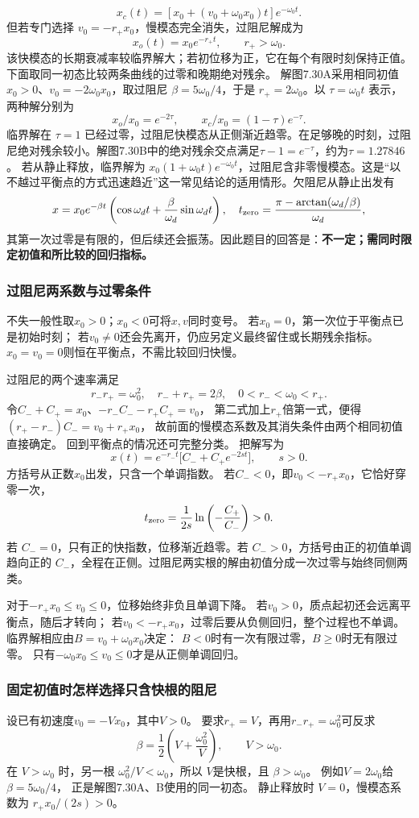 \documentclass[UTF8,fontset=fandol,a4paper,11pt]{ctexart}
\begin{document}
\[x_c(t)=[x_0+(v_0+\omega_0x_0)t]e^{-\omega_0t}.\]
但若专门选择 $v_0=-r_+x_0$，慢模态完全消失，过阻尼解成为
\[\boxed{x_o(t)=x_0e^{-r_+t},\qquad r_+>\omega_0.}\]
该快模态的长期衰减率较临界解大；若初位移为正，它在每个有限时刻保持正值。下面取同一初态比较两条曲线的过零和晚期绝对残余。
解图7.30A采用相同初值 $x_0>0$、$v_0=-2\omega_0x_0$，取过阻尼 $\beta=5\omega_0/4$，于是 $r_+=2\omega_0$。以 $\tau=\omega_0t$ 表示，两种解分别为
\[x_o/x_0=e^{-2\tau},\qquad x_c/x_0=(1-\tau)e^{-\tau}.\]
临界解在 $\tau=1$ 已经过零，过阻尼快模态从正侧渐近趋零。在足够晚的时刻，过阻尼绝对残余较小。解图7.30B中的绝对残余交点满足$\tau-1=e^{-\tau}$，约为$\tau=1.27846$。
若从静止释放，临界解为 $x_0(1+\omega_0t)e^{-\omega_0t}$，过阻尼含非零慢模态。这是“以不越过平衡点的方式迅速趋近”这一常见结论的适用情形。欠阻尼从静止出发有
\[x=x_0e^{-\beta t}\left(\cos\omega_dt+\frac\beta{\omega_d}\sin\omega_dt\right),\quad
 t_{\rm zero}=\frac{\pi-\arctan(\omega_d/\beta)}{\omega_d},\]
其第一次过零是有限的，但后续还会振荡。因此题目的回答是：\textbf{不一定；需同时限定初值和所比较的回归指标。}
\subsubsection*{过阻尼两系数与过零条件}
不失一般性取$x_0>0$；$x_0<0$可将$x,v$同时变号。
若$x_0=0$，第一次位于平衡点已是初始时刻；
若$v_0\ne0$还会先离开，仍应另定义最终留住或长期残余指标。
$x_0=v_0=0$则恒在平衡点，不需比较回归快慢。

过阻尼的两个速率满足
\[
r_-r_+=\omega_0^2,\quad r_-+r_+=2\beta,\quad
0<r_-<\omega_0<r_+.
\]
令$C_-+C_+=x_0$、$-r_-C_--r_+C_+=v_0$，
第二式加上$r_+$倍第一式，便得
$(r_+-r_-)C_-=v_0+r_+x_0$，
故前面的慢模态系数及其消失条件由两个相同初值直接确定。
回到平衡点的情况还可完整分类。
把解写为
\[
x(t)=e^{-r_-t}\bigl[C_-+C_+e^{-2st}\bigr],\qquad s>0.
\]
方括号从正数$x_0$出发，只含一个单调指数。
若$C_-<0$，即$v_0<-r_+x_0$，它恰好穿零一次，
\[
t_{\rm zero}=\frac1{2s}\ln\left(-\frac{C_+}{C_-}\right)>0.
\]
若 $C_-=0$，只有正的快指数，位移渐近趋零。若 $C_->0$，方括号由正的初值单调趋向正的 $C_-$，全程在正侧。过阻尼两实根的解由初值分成一次过零与始终同侧两类。

对于$-r_+x_0\le v_0\le0$，位移始终非负且单调下降。
若$v_0>0$，质点起初还会远离平衡点，随后才转向；
若$v_0<-r_+x_0$，过零后要从负侧回归，整个过程也不单调。
临界解相应由$B=v_0+\omega_0x_0$决定：
$B<0$时有一次有限过零，$B\ge0$时无有限过零。
只有$-\omega_0x_0\le v_0\le0$才是从正侧单调回归。

\subsubsection*{固定初值时怎样选择只含快根的阻尼}
设已有初速度$v_0=-Vx_0$，其中$V>0$。
要求$r_+=V$，再用$r_-r_+=\omega_0^2$可反求
\[
\beta=\frac12\left(V+\frac{\omega_0^2}{V}\right),\qquad
V>\omega_0.
\]
在 $V>\omega_0$ 时，另一根 $\omega_0^2/V<\omega_0$，所以 $V$是快根，且 $\beta>\omega_0$。
例如$V=2\omega_0$给$\beta=5\omega_0/4$，
正是解图7.30A、B使用的同一初态。
静止释放时 $V=0$，慢模态系数为 $r_+x_0/(2s)>0$。
\end{document}
